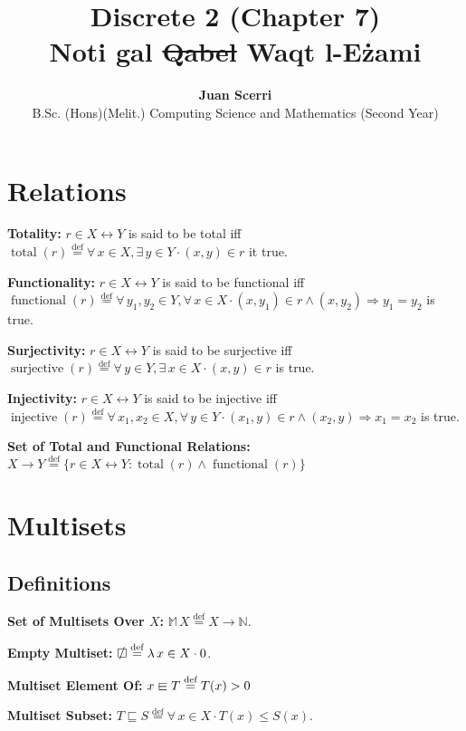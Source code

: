 \documentclass[12pt]{article}
\title{Discrete 2 (Chapter 7)\\
\vspace{0.75em}\textbf{Noti g\mh al \st{Qabel} Waqt l-E\.zami}}
\author {{\textbf{Juan Scerri}}\\
B.Sc. (Hons)(Melit.) Computing Science and Mathematics (Second Year)}
\newcommand{\defeq}{\stackrel{\text{def}}{=}}
\newcommand{\sqemptyset}{\ensurestackMath{\stackinset{c}{}{c}{}{/}{\square}}}
\newcommand{\sqin}{%
  \mathrel{\vphantom{\sqsubset}\text{%
    \mathsurround=0pt
    \ooalign{$\sqsubset$\cr$-$\cr}%
  }}%
}
\DeclareMathOperator{\jtotal}{total}
\DeclareMathOperator{\jfunctional}{functional}
\DeclareMathOperator{\jinjective}{injective}
\DeclareMathOperator{\jsurjective}{surjective}
\theoremstyle{plain}
\begin{document}
\maketitle %

\thispagestyle{empty} %

\raggedright

\section{Relations}

\textbf{Totality:} $r \in X \leftrightarrow Y$ is said to be
total iff $\jtotal(r) \defeq \forall\, x \in X, \exists\, y \in
Y \cdot (x, y) \in r$ it true.

\textbf{Functionality:} $r \in X \leftrightarrow Y$ is said to
be functional iff $\jfunctional(r) \defeq\forall\, y_1, y_2 \in
Y, \forall\, x \in X \cdot (x, y_1) \in r \land (x, y_2)
\Rightarrow y_1 = y_2$ is true.

\textbf{Surjectivity:} $r \in X \leftrightarrow Y$ is said to be
surjective iff $\jsurjective(r) \defeq\forall\, y \in Y,
\exists\, x \in X \cdot (x, y) \in r$ is true.

\textbf{Injectivity:} $r \in X \leftrightarrow Y$ is said to be
injective iff $\jinjective(r) \defeq \forall\, x_1, x_2 \in X,
\forall\, y \in Y \cdot (x_1, y) \in r \land (x_2, y)
\Rightarrow x_1 = x_2$ is true.

\textbf{Set of Total and Functional Relations:} $X \rightarrow Y
\defeq \{r \in X \leftrightarrow Y : \jtotal(r)
\land \jfunctional(r) \}$

\section{Multisets}

\subsection{Definitions}

\textbf{Set of Multisets Over $X$:} $\mathbb{M}\,X \defeq X
\rightarrow \mathbb{N}$.

\textbf{Empty Multiset:} $\sqemptyset \defeq \lambda\, x \in X
\cdot 0$.

\textbf{Multiset Element Of:} $x \sqin T \defeq T(x) > 0$

\textbf{Multiset Subset:} $T \sqsubseteq S \defeq \forall\, x
\in X \cdot T(x) \leq S(x)$.
\end{document}
